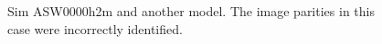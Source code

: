 \documentclass[12pt,preprint]{aastex}
\begin{document}
\begin{figure}
{  }

  \caption[result 7025 (ASW0000h2m)]{Sim ASW0000h2m and another model.  The image parities in this case were incorrectly identified.}
  \label{fig:7025}
\end{figure}
  
\end{document}

